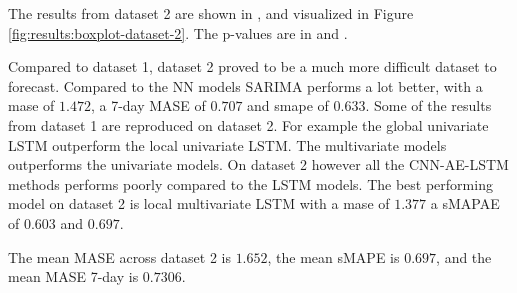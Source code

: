 The results from dataset 2 are shown in ,
and visualized in Figure \ref{fig:results:boxplot-dataset-2}. The p-values
are in  and
.

Compared to dataset 1, dataset 2 proved to be a much more difficult dataset to forecast.
Compared to the NN models SARIMA performs a lot better, with a mase of $1.472$, a 7-day MASE of $0.707$ and smape of $0.633$.
Some of the results from dataset 1 are reproduced on dataset 2. For example the global univariate LSTM outperform
the local univariate LSTM. The multivariate models outperforms the univariate models.
On dataset 2 however all the CNN-AE-LSTM methods performs poorly compared to the LSTM models.
The best performing model on dataset 2 is local multivariate LSTM with a mase of $1.377$ a sMAPAE of $0.603$
and $0.697$.

The mean MASE across dataset 2 is $1.652$,
the mean sMAPE is $0.697$,
and the mean MASE 7-day is  $0.7306$.

